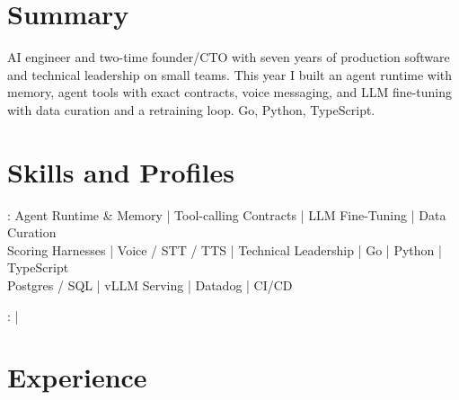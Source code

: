 \documentclass[print]{jack-resume}
\begin{document}
\pagecolor{darkmodeBackground}


\begin{minipage}[t][1cm][t]{.03\textwidth}
    \hfill
\end{minipage}

\section{Summary}
AI engineer and two-time founder/CTO with seven years of production software and technical leadership on small teams. This year I built an agent runtime with memory, agent tools with exact contracts, voice messaging, and LLM fine-tuning with data curation and a retraining loop. Go, Python, TypeScript.
\sectionsep

\section{Skills and Profiles}
:
Agent Runtime \& Memory \hfill | \hfill
Tool-calling Contracts \hfill | \hfill
LLM Fine-Tuning \hfill | \hfill
Data Curation \\
\hspace{1.0cm} Scoring Harnesses \hfill | \hfill
Voice / STT / TTS \hfill | \hfill
Technical Leadership \hfill | \hfill
Go \hfill | \hfill
Python \hfill | \hfill
TypeScript \\
\hspace{1.0cm} Postgres / SQL \hfill | \hfill
vLLM Serving \hfill | \hfill
Datadog \hfill | \hfill
CI/CD \\

\raggedright{
    :
      \href{https://www.linkedin.com/in/jack-sturtevant/}{ \ExternalLink} |
     \href{https://github.com/jacksturt}{ \ExternalLink}}

\section{Experience}
\end{document}
